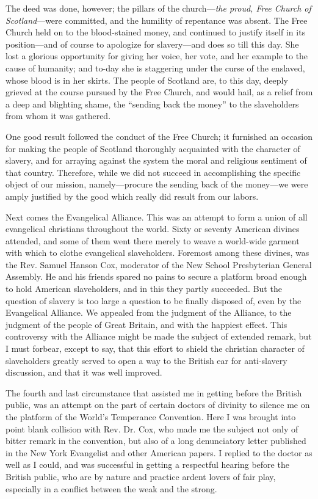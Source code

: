 The deed was done, however; the pillars of the church---\emph{the proud,
Free Church of Scotland}---were committed, and the humility of
repentance was absent. The Free Church held on to the blood-stained
money, and continued to justify itself in its position---and of course
to apologize for slavery---and does so till this day. She lost a
glorious opportunity for giving her voice, her vote, and her example to
the cause of humanity; and to-day she is staggering under the curse of
the enslaved, whose blood is in her skirts. The people of Scotland are,
to this day, deeply grieved at the course pursued by the Free Church,
and would hail, as a relief from a deep and blighting shame, the
``sending back the money'' to the slaveholders from whom it was
gathered.

One good result followed the conduct of the Free Church; it furnished an
occasion for making the people of Scotland thoroughly acquainted with
the character of slavery, and for arraying against the system the moral
and religious sentiment of that country. Therefore, while we did not
succeed in accomplishing the specific object of our mission,
namely---procure the sending back of the money---we were amply justified
by the good which really did result from our labors.

Next comes the Evangelical Alliance. This was an attempt to form a union
of all evangelical {}christians throughout the world. Sixty or seventy
American divines attended, and some of them went there merely to weave a
world-wide garment with which to clothe evangelical slaveholders.
Foremost among these divines, was the Rev. Samuel Hanson Cox, moderator
of the New School Presbyterian General Assembly. He and his friends
spared no pains to secure a platform broad enough to hold American
slaveholders, and in this they partly succeeded. But the question of
slavery is too large a question to be finally disposed of, even by the
Evangelical Alliance. We appealed from the judgment of the Alliance, to
the judgment of the people of Great Britain, and with the happiest
effect. This controversy with the Alliance might be made the subject of
extended remark, but I must forbear, except to say, that this effort to
shield the christian character of slaveholders greatly served to open a
way to the British ear for anti-slavery discussion, and that it was well
improved.

The fourth and last circumstance that assisted me in getting before the
British public, was an attempt on the part of certain doctors of
divinity to silence me on the platform of the World's Temperance
Convention. Here I was brought into point blank collision with Rev. Dr.
Cox, who made me the subject not only of bitter remark in the
convention, but also of a long denunciatory letter published in the New
York Evangelist and other American papers. I replied to the doctor as
well as I could, and was successful in getting a respectful hearing
before the British public, who are by nature and practice ardent
{}lovers of fair play, especially in a conflict between the weak and the
strong.

